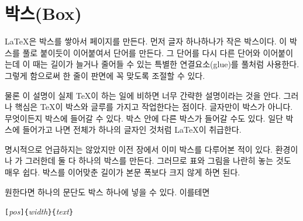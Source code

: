 \section{박스(Box)}

\LaTeX 은 박스를 쌓아서 페이지를 만든다. 먼저 글자 하나하나가 작은 박스이다.
이 박스를 풀로 붙이듯이 이어붙여서 단어를 만든다. 그 단어를 다시 다른 단어와 이어붙이는데 이 때는 길이가 늘거나 줄어들 수 있는 특별한 연결요소(glue)를 풀처럼 사용한다. 그렇게 함으로써 한 줄이 판면에 꼭 맞도록 조절할 수 있다.

물론 이 설명이 실제 \TeX 이 하는 일에 비하면 너무 간략한 설명이라는 것을 안다.
그러나 핵심은 \TeX 이 박스와 글루를 가지고 작업한다는 점이다.
글자만이 박스가 아니다. 무엇이든지 박스에 들어갈 수 있다. 박스 안에 다른 박스가 들어갈 수도 있다. 일단 박스에 들어가고 나면 전체가 하나의 글자인 것처럼 \LaTeX 이 취급한다.

명시적으로 언급하지는 않았지만 이전 장에서 이미 박스를 다루어본 적이 있다.
 환경이나 가 그러한데 둘 다 하나의 박스를 만든다.
그러므로 표와 그림을 나란히 놓는 것도 매우 쉽다.
박스를 이어맞춘 길이가 본문 폭보다 크지 않게 하면 된다.

원한다면 하나의 문단도 박스 하나에 넣을 수 있다. 이를테면

\begin{lscommand}
\verb|[|\emph{pos}\verb|]{|\emph{width}\verb|}{|\emph{text}\verb|}|
\end{lscommand}

